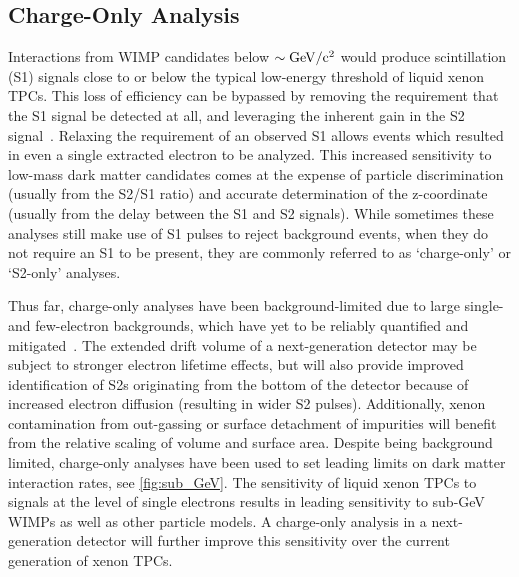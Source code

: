\subsection{Charge-Only Analysis}\label{sec:s2only}

Interactions from WIMP candidates below $\sim\mathrm{GeV/c^2}$ would produce scintillation (S1) signals close to or below the typical low-energy threshold of liquid xenon TPCs. This loss of efficiency can be bypassed by removing the requirement that the S1 signal be detected at all, and leveraging the inherent gain in the S2 signal~\cite{Aprile:2016wwo, Agnes:2018ves, Aprile:2019xxb, Akerib:2021pfd}. Relaxing the requirement of an observed S1 allows events which resulted in even a single extracted electron to be analyzed. This increased sensitivity to low-mass dark matter candidates comes at the expense of particle discrimination (usually from the S2/S1 ratio) and accurate determination of the z-coordinate (usually from the delay between the S1 and S2 signals). While sometimes these analyses still make use of S1 pulses to reject background events, when they do not require an S1 to be present, they are commonly referred to as `charge-only' or `S2-only' analyses.

Thus far, charge-only analyses have been background-limited due to large single- and few-electron backgrounds, which have yet to be reliably quantified and mitigated~\cite{Akerib:2020jud, Kopec:2021ccm, Bodnia:2021flk, Akimov:2016rbs, Aprile:2013blg, Sorensen:2017kpl, Sorensen:2017ymt}. The extended drift volume of a next-generation detector may be subject to stronger electron lifetime effects, but will also provide improved identification of S2s originating from the bottom of the detector because of increased electron diffusion (resulting in wider S2 pulses). Additionally, xenon contamination from out-gassing or surface detachment of impurities will benefit from the relative scaling of volume and surface area. Despite being background limited, charge-only analyses have been used to set leading limits on dark matter interaction rates, see \autoref{fig:sub_GeV}. The sensitivity of liquid xenon TPCs to signals at the level of single electrons results in leading sensitivity to sub-GeV WIMPs as well as other particle models. A charge-only analysis in a next-generation detector will further improve this sensitivity over the current generation of xenon TPCs. 

